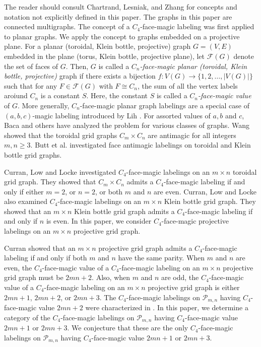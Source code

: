\documentclass[12pt]{amsart}
\theoremstyle{definition}
\theoremstyle{plain}
\begin{document}
The reader should consult Chartrand, Lesniak, and Zhang \cite{Chartrand} for concepts and notation not explicitly defined in this paper.
The graphs in this paper are connected multigraphs.
The concept of a $C_4$-face-magic labeling was first applied to planar graphs.
We apply the concept to graphs embedded on a projective plane.
For a planar (toroidal, Klein bottle, projective) graph $G = (V, E)$ embedded in the plane (torus, Klein bottle, projective plane),
let $\mathcal{F}(G)$ denote the set of faces of $G$.
Then, $G$ is called a \textit{$C_n$-face-magic planar (toroidal, Klein bottle, projective)} graph if there
exists a bijection $f: V(G) \to \{1, 2, \dots, |V(G)|\}$ such that for any $F \in \mathcal{F}(G)$ with $F \cong C_n$,
the sum of all the vertex labels aroiund $C_n$ is a constant $S$. Here, the constant $S$ is called
a \textit{$C_n$-face-magic value} of $G$.
More generally, $C_n$-face-magic planar graph labelings are a special case of $(a, b, c)$-magic labeling
introduced by Lih \cite{Lih}.
For assorted values of $a, b$ and $c$, Baca and others \cite{Baca1, Baca2, Baca3, Hsieh, Kasif, Kath, Lih} have analyzed
the problem for various classes of graphs.
Wang \cite{Wang} showed that the toroidal grid graphs $C_m \times C_n$ are antimagic for all integers $m,n\geqslant 3$.
Butt et al. \cite{Buttetal} investigated face antimagic labelings on toroidal and Klein bottle grid graphs.

Curran, Low and Locke \cite{CurranLow, CurranLowLocke1} investigated $C_4$-face-magic labelings
on an $m \times n$ toroidal grid graph.
They showed that $C_m \times C_n$ admits a $C_4$-face-magic labeling if and only if either $m=2$, or $n=2$, or both $m$ and $n$ are even.
Curran, Low and Locke \cite{CurranLowLocke2} also examined $C_4$-face-magic labelings on an $m \times n$
Klein bottle grid graph.
They showed that an $m \times n$ Klein bottle grid graph  admits a $C_4$-face-magic labeling if and only if $n$ is even.
In this paper, we consider $C_4$-face-magic projective labelings on an $m \times n$
projective grid graph.

Curran \cite{Curran2} showed that an $m \times n$ projective grid graph  admits a $C_4$-face-magic labeling if and only if both $m$ and $n$ have the same parity.
When $m$ and $n$ are even, the $C_4$-face-magic value of a $C_4$-face-magic labeling on an $m\times n$ projective grid graph must be $2mn+2$.
Also, when $m$ and $n$ are odd, the $C_4$-face-magic value of a $C_4$-face-magic labeling on an $m\times n$ projective grid graph is
either $2mn+1$, $2mn+2$, or $2mn+3$.
The $C_4$-face-magic labelings on $\mathcal{P}_{m,n}$ having $C_4$-face-magic value $2mn+2$ were characterized in \cite{Curran2}.
In this paper, we determine a category of the $C_4$-face-magic labelings on $\mathcal{P}_{m,n}$ having $C_4$-face-magic value $2mn+1$ or $2mn+3$.
We conjecture that these are the only $C_4$-face-magic labelings on $\mathcal{P}_{m,n}$ having  $C_4$-face-magic value $2mn+1$ or $2mn+3$.
\end{document}
